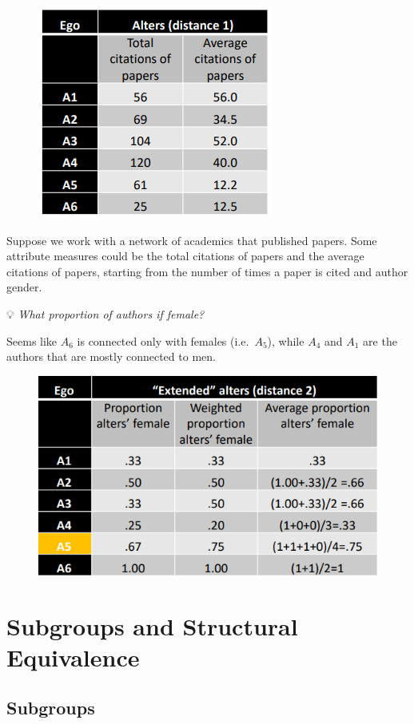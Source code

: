 \documentclass[
  notitlepage,
  onecolumn,
  openany]{book}
\begin{document}
\begin{figure}[h!]

{\centering \includegraphics[width=0.4\linewidth]{images/10-Two mode networks/Untitled 13} 

}

\end{figure}

Suppose we work with a network of academics that published papers. Some attribute measures could be the total citations of papers and the average citations of papers, starting from the number of times a paper is cited and author gender.

💡 \emph{What proportion of authors if female?}

Seems like \(A_6\) is connected only with females (i.e.~\(A_5\)), while \(A_4\) and \(A_1\) are the authors that are mostly connected to men.

\begin{figure}[h!]

{\centering \includegraphics[width=0.5\linewidth]{images/10-Two mode networks/Untitled 14} 

}

\end{figure}

\hypertarget{subgroups-and-structural-equivalence}{%
\chapter{Subgroups and Structural Equivalence}\label{subgroups-and-structural-equivalence}}

\hypertarget{subgroups}{%
\section{Subgroups}\label{subgroups}}
\end{document}
